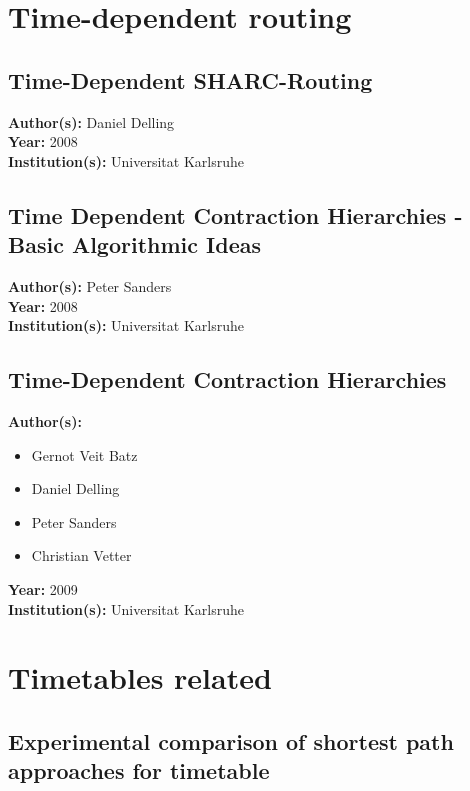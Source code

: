 \documentclass[a4paper]{article}
\newenvironment{itemizesp}
{
    \begin{itemize}
}
{
    \end{itemize}
}
\newcommand{\textbff}[1]{{\large \textbf{#1}}}
\begin{document}
    \pagebreak
    \section{Time-dependent routing}

        \subsection{Time-Dependent SHARC-Routing}
        \label{subsec:sharc}

        \textbff{Author(s): } Daniel Delling \\
        \textbff{Year: }2008\\
        \textbff{Institution(s): }Universitat Karlsruhe

        \subsection{Time Dependent Contraction Hierarchies - Basic Algorithmic Ideas}
        \label{subsec:tchbasicalgideas}

        \textbff{Author(s): } Peter Sanders \\
        \textbff{Year: }2008\\
        \textbff{Institution(s): }Universitat Karlsruhe

        \subsection{Time-Dependent Contraction Hierarchies}
        \label{subsec:timedepch}

        \textbff{Author(s): }
        \begin{itemizesp}
            \item Gernot Veit Batz
            \item Daniel Delling
            \item Peter Sanders
            \item Christian Vetter
        \end{itemizesp}
        \textbff{Year: }2009\\
        \textbff{Institution(s): }Universitat Karlsruhe

    \pagebreak
    \section{Timetables related}

        \subsection{Experimental comparison of shortest path approaches for timetable}
        \label{subsec:compshpathapp}
\end{document}

